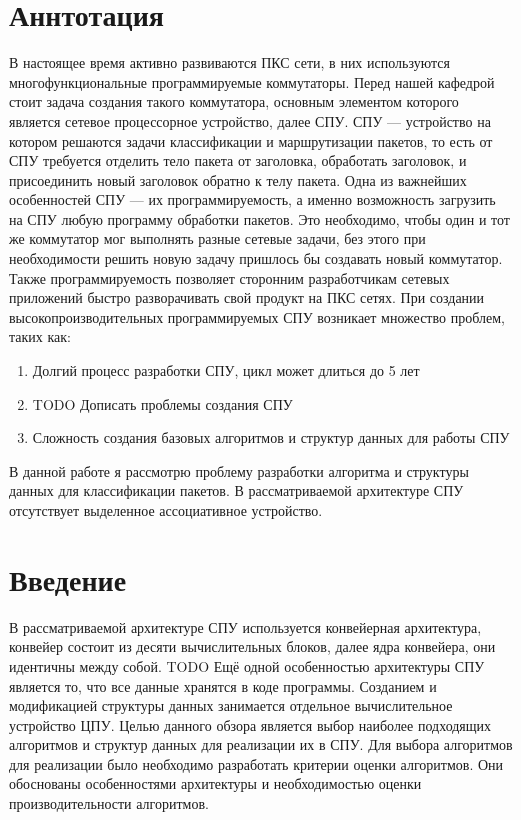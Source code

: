 \documentclass[a4peper, 12pt, titlepage, finall]{extreport}
\begin{document}
    \section{Аннтотация}
        В настоящее время активно развиваются ПКС сети, в них используются многофункциональные программируемые коммутаторы. 
        Перед нашей кафедрой стоит задача создания такого коммутатора, основным элементом которого является сетевое процессорное устройство, далее СПУ. 
        СПУ — устройство на котором решаются задачи классификации и маршрутизации пакетов, то есть от
        СПУ требуется отделить тело пакета от заголовка, обработать заголовок, и присоединить новый заголовок обратно к телу пакета. 
        Одна из важнейших особенностей СПУ — их программируемость, а именно возможность загрузить на СПУ любую программу обработки пакетов.  
        Это необходимо, чтобы один и тот же коммутатор мог выполнять разные сетевые задачи, без этого при необходимости решить новую задачу пришлось бы создавать новый коммутатор.
        Также программируемость позволяет сторонним разработчикам сетевых приложений быстро разворачивать свой продукт на ПКС сетях. 
        При создании высокопроизводительных программируемых СПУ возникает множество проблем, таких как: 
        \begin{enumerate}
            \item Долгий процесс разработки СПУ, цикл может длиться до 5 лет
            \item {\ttfamily TODO Дописать проблемы создания СПУ}
            \item Сложность создания базовых алгоритмов и структур данных для работы СПУ

        \end{enumerate}
        В данной работе я рассмотрю проблему разработки алгоритма и структуры данных для классификации пакетов. 
        В рассматриваемой архитектуре СПУ отсутствует выделенное ассоциативное устройство. 

    \section{Введение}
        В рассматриваемой архитектуре СПУ используется конвейерная архитектура, конвейер состоит из десяти вычислительных блоков, 
        далее ядра конвейера, они идентичны между собой. TODO Ещё одной особенностью архитектуры СПУ является то, что все данные хранятся в коде программы. 
        Созданием и модификацией структуры данных занимается отдельное вычислительное устройство ЦПУ.
        Целью данного обзора является выбор наиболее подходящих алгоритмов и структур данных для реализации их в СПУ. 
        Для выбора алгоритмов для реализации было необходимо разработать критерии оценки алгоритмов. 
        Они обоснованы особенностями архитектуры и необходимостью оценки производительности алгоритмов.
\end{document}
